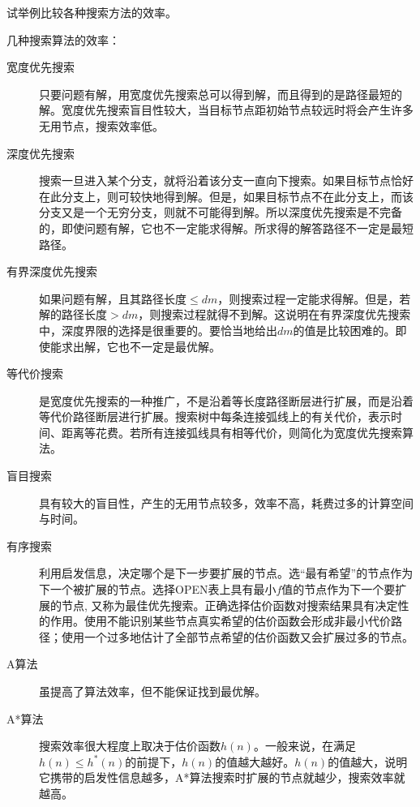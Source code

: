 \begin{question}
试举例比较各种搜索方法的效率。
\end{question}	
\begin{solution}
几种搜索算法的效率：
	\begin{description}
		\item[宽度优先搜索] 只要问题有解，用宽度优先搜索总可以得到解，而且得到的是路径最短的解。宽度优先搜索盲目性较大，当目标节点距初始节点较远时将会产生许多无用节点，搜索效率低。
		\item[深度优先搜索] 搜索一旦进入某个分支，就将沿着该分支一直向下搜索。如果目标节点恰好在此分支上，则可较快地得到解。但是，如果目标节点不在此分支上，而该分支又是一个无穷分支，则就不可能得到解。所以深度优先搜索是不完备的，即使问题有解，它也不一定能求得解。所求得的解答路径不一定是最短路径。
		\item[有界深度优先搜索] 如果问题有解，且其路径长度$\leq dm$，则搜索过程一定能求得解。但是，若解的路径长度$> dm$，则搜索过程就得不到解。这说明在有界深度优先搜索中，深度界限的选择是很重要的。要恰当地给出$dm$的值是比较困难的。即使能求出解，它也不一定是最优解。
		\item[等代价搜索] 是宽度优先搜索的一种推广，不是沿着等长度路径断层进行扩展，而是沿着等代价路径断层进行扩展。搜索树中每条连接弧线上的有关代价，表示时间、距离等花费。若所有连接弧线具有相等代价，则简化为宽度优先搜索算法。
		\item[盲目搜索] 具有较大的盲目性，产生的无用节点较多，效率不高，耗费过多的计算空间与时间。
		\item[有序搜索] 利用启发信息，决定哪个是下一步要扩展的节点。选``最有希望''的节点作为下一个被扩展的节点。选择OPEN表上具有最小$f$值的节点作为下一个要扩展的节点, 又称为最佳优先搜索。正确选择估价函数对搜索结果具有决定性的作用。使用不能识别某些节点真实希望的估价函数会形成非最小代价路径；使用一个过多地估计了全部节点希望的估价函数又会扩展过多的节点。 
		\item[A算法] 虽提高了算法效率，但不能保证找到最优解。
		\item[A*算法] 搜索效率很大程度上取决于估价函数$h(n)$。一般来说，在满足$h(n)\leq h^*(n)$的前提下，$h(n)$的值越大越好。$h(n)$的值越大，说明它携带的启发性信息越多，A*算法搜索时扩展的节点就越少，搜索效率就越高。
	\end{description}

\end{solution}

